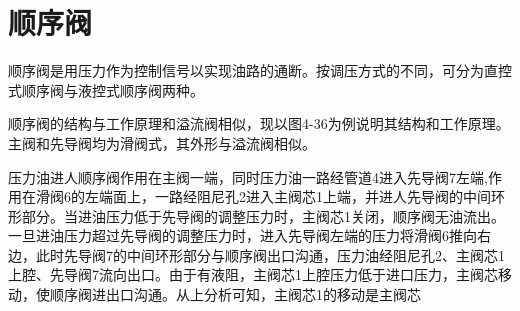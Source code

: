\section{顺序阀}

顺序阀是用压力作为控制信号以实现油路的通断。按调压方式的不同，可分为直控式顺序阀与液控式顺序阀两种。

顺序阀的结构与工作原理和溢流阀相似，现以图4-36为例说明其结构和工作原理。主阀和先导阀均为滑阀式，其外形与溢流阀相似。

压力油进人顺序阀作用在主阀一端，同时压力油一路经管道4进入先导阀7左端,作用在滑阀6的左端面上，一路经阻尼孔2进入主阀芯1上端，并进人先导阀的中间环形部分。当进油压力低于先导阀的调整压力时，主阀芯1关闭，顺序阀无油流出。一旦进油压力超过先导阀的调整压力时，进入先导阀左端的压力将滑阀6推向右边，此时先导阀7的中间环形部分与顺序阀出口沟通，压力油经阻尼孔2、主阀芯1上腔、先导阀7流向出口。由于有液阻，主阀芯1上腔压力低于进口压力，主阀芯移动，使顺序阀进出口沟通。从上分析可知，主阀芯1的移动是主阀芯

